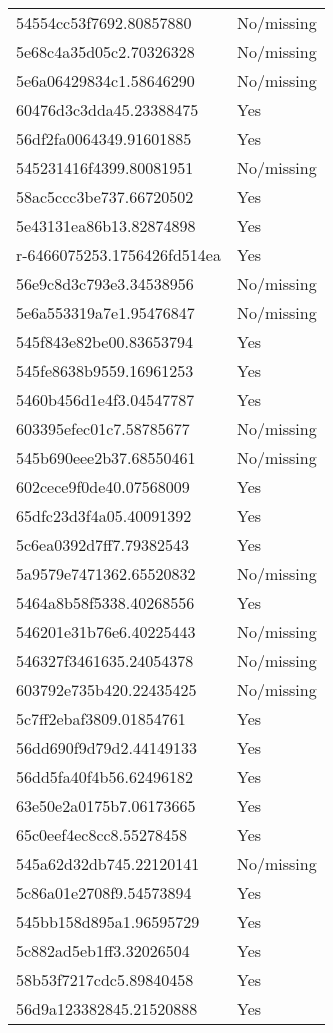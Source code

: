 \begin{tabular}{ll}
54554cc53f7692.80857880 & No/missing \\
5e68c4a35d05c2.70326328 & No/missing \\
5e6a06429834c1.58646290 & No/missing \\
60476d3c3dda45.23388475 & Yes \\
56df2fa0064349.91601885 & Yes \\
545231416f4399.80081951 & No/missing \\
58ac5ccc3be737.66720502 & Yes \\
5e43131ea86b13.82874898 & Yes \\
r-6466075253.1756426fd514ea & Yes \\
56e9c8d3c793e3.34538956 & No/missing \\
5e6a553319a7e1.95476847 & No/missing \\
545f843e82be00.83653794 & Yes \\
545fe8638b9559.16961253 & Yes \\
5460b456d1e4f3.04547787 & Yes \\
603395efec01c7.58785677 & No/missing \\
545b690eee2b37.68550461 & No/missing \\
602cece9f0de40.07568009 & Yes \\
65dfc23d3f4a05.40091392 & Yes \\
5c6ea0392d7ff7.79382543 & Yes \\
5a9579e7471362.65520832 & No/missing \\
5464a8b58f5338.40268556 & Yes \\
546201e31b76e6.40225443 & No/missing \\
546327f3461635.24054378 & No/missing \\
603792e735b420.22435425 & No/missing \\
5c7ff2ebaf3809.01854761 & Yes \\
56dd690f9d79d2.44149133 & Yes \\
56dd5fa40f4b56.62496182 & Yes \\
63e50e2a0175b7.06173665 & Yes \\
65c0eef4ec8cc8.55278458 & Yes \\
545a62d32db745.22120141 & No/missing \\
5c86a01e2708f9.54573894 & Yes \\
545bb158d895a1.96595729 & Yes \\
5c882ad5eb1ff3.32026504 & Yes \\
58b53f7217cdc5.89840458 & Yes \\
56d9a123382845.21520888 & Yes \\

\end{tabular}
